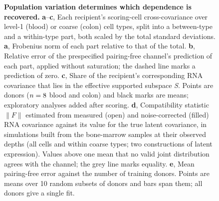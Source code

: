 \documentclass[10pt,a4paper]{article}
\begin{document}
\begin{figure}[p]
\centering

\caption{\textbf{Population variation determines which dependence is recovered.}
\textbf{a}--\textbf{c}, Each recipient's scoring-cell cross-covariance over level-1 (blood) or coarse (colon) cell types, split into a between-type and a within-type part, both scaled by the total standard deviations. \textbf{a}, Frobenius norm of each part relative to that of the total. \textbf{b}, Relative error of the prespecified pairing-free channel's prediction of each part, applied without saturation; the dashed line marks a prediction of zero. \textbf{c}, Share of the recipient's corresponding RNA covariance that lies in the effective supported subspace \textit{S}. Points are donors ($n=8$ blood and \XsColonDonors{} colon) and black marks are means; exploratory analyses added after scoring.
\textbf{d}, Compatibility statistic $\|F\|$ estimated from measured (open) and noise-corrected (filled) RNA covariance against its value for the true latent covariance, in simulations built from the \RcBmSamples{} bone-marrow samples at their observed depths (all cells and within coarse types; two constructions of latent expression). Values above one mean that no valid joint distribution agrees with the channel; the grey line marks equality.
\textbf{e}, Mean pairing-free error against the number of training donors. Points are means over 10 random subsets of donors and bars span them; all \XsPatients{} donors give a single fit.}
\label{sfig:ident}
\end{figure}
\end{document}
